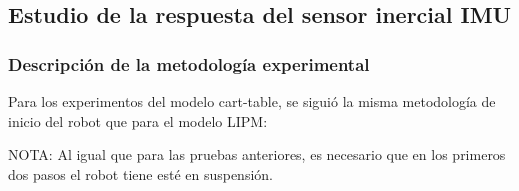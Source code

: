 \subsection{Estudio de la respuesta del sensor inercial IMU}\label{respuestaIMU}

\subsubsection{Descripción de la metodología experimental}

Para los experimentos del modelo cart-table, se siguió la misma metodología de inicio del robot que para el modelo LIPM:

NOTA: Al igual que para las pruebas anteriores, es necesario que en los primeros dos pasos el robot tiene esté en suspensión.

